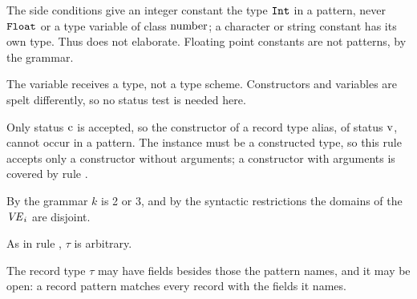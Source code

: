 











\begin{rulecomments}
 The side conditions give an integer constant the type
$\mathtt{Int}$ in a pattern, never $\mathtt{Float}$ or a type variable of class $\mathrm{number}$; a
character or string constant has its own type. Thus  does not elaborate. Floating point constants are not patterns, by the
grammar.

 The variable receives a type, not a type scheme.
Constructors and variables are spelt differently, so no status test is needed
here.

 Only status $\mathrm{c}$ is accepted, so the constructor of a
record type alias, of status $\mathrm{v}$, cannot occur in a pattern. The instance
must be a constructed type, so this rule accepts only a constructor without
arguments; a constructor with arguments is covered by rule
.

 By the grammar $k$ is 2 or 3, and by the syntactic
restrictions the domains of the $\mathit{VE}_i$ are disjoint.

 As in rule , $\tau$ is
arbitrary.

 The record type $\tau$ may have fields besides those
the pattern names, and it may be open: a record pattern matches every record
with the fields it names.
\end{rulecomments}

